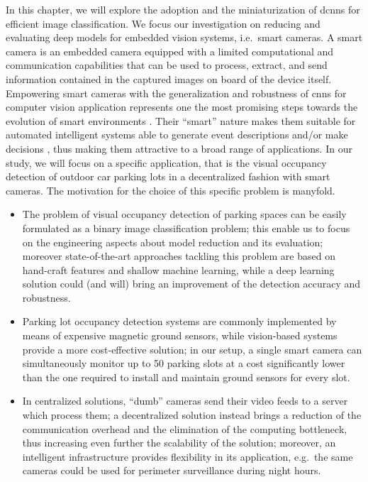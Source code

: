 In this chapter, we will explore the adoption and the miniaturization of \glspl{dcnn} for efficient image classification.
We focus our investigation on reducing and evaluating deep models for embedded vision systems, i.e.\ smart cameras.
A smart camera is an embedded camera equipped with a limited computational and communication capabilities that can be used to process, extract, and send information contained in the captured images on board of the device itself.
Empowering smart cameras with the generalization and robustness of \glspl{cnn} for computer vision application represents one the most promising steps towards the evolution of smart environments \cite{}.
Their ``smart'' nature makes them suitable for automated intelligent systems able to generate event descriptions and/or make decisions \cite{belbachir2010smart}, thus making them attractive to a broad range of applications.
In our study, we will focus on a specific application, that is the visual occupancy detection of outdoor car parking lots in a decentralized fashion with smart cameras.
The motivation for the choice of this specific problem is manyfold.
\begin{itemize}
	\item The problem of visual occupancy detection of parking spaces can be easily formulated as a binary image classification problem;
	this enable us to focus on the engineering aspects about model reduction and its evaluation;
	moreover state-of-the-art approaches tackling this problem are based on hand-craft features and shallow machine learning, while a deep learning solution could (and will) bring an improvement of the detection accuracy and robustness.

	\item Parking lot occupancy detection systems are commonly implemented by means of expensive magnetic ground sensors, while vision-based systems provide a more cost-effective solution;
	in our setup, a single smart camera can simultaneously monitor up to 50 parking slots at a cost significantly lower than the one required to install and maintain ground sensors for every slot.

	\item In centralized solutions, ``dumb'' cameras send their video feeds to a server which process them;
	a decentralized solution instead brings a reduction of the communication overhead and the elimination of the computing bottleneck, thus increasing even further the scalability of the solution;
	moreover, an intelligent infrastructure provides flexibility in its application, e.g.\ the same cameras could be used for perimeter surveillance during night hours.

\end{itemize}

